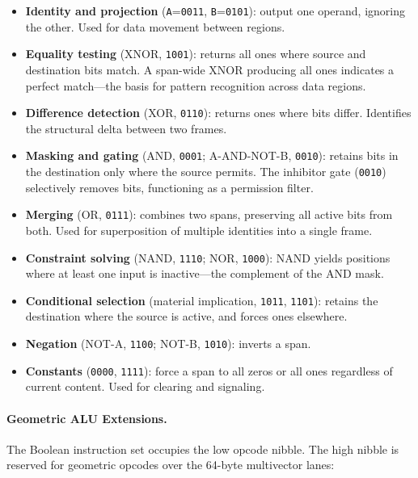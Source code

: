 \begin{itemize}[nosep]
  \item \textbf{Identity and projection} (\texttt{A}=\texttt{0011},
        \texttt{B}=\texttt{0101}): output one operand, ignoring the other.
        Used for data movement between regions.
  \item \textbf{Equality testing} (XNOR, \texttt{1001}): returns all
        ones where source and destination bits match.  A span-wide XNOR
        producing all ones indicates a perfect match---the basis for
        pattern recognition across data regions.
  \item \textbf{Difference detection} (XOR, \texttt{0110}): returns
        ones where bits differ.  Identifies the structural delta between
        two frames.
  \item \textbf{Masking and gating} (AND, \texttt{0001};
        A-AND-NOT-B, \texttt{0010}): retains bits in the destination
        only where the source permits.  The inhibitor gate
        (\texttt{0010}) selectively removes bits, functioning as a
        permission filter.
  \item \textbf{Merging} (OR, \texttt{0111}): combines two spans,
        preserving all active bits from both.  Used for superposition of
        multiple identities into a single frame.
  \item \textbf{Constraint solving} (NAND, \texttt{1110}; NOR,
        \texttt{1000}): NAND yields positions where at least one input
        is inactive---the complement of the AND mask.
  \item \textbf{Conditional selection} (material implication,
        \texttt{1011}, \texttt{1101}): retains the destination where the
        source is active, and forces ones elsewhere.
  \item \textbf{Negation} (NOT-A, \texttt{1100}; NOT-B, \texttt{1010}):
        inverts a span.
  \item \textbf{Constants} (\texttt{0000}, \texttt{1111}): force a
        span to all zeros or all ones regardless of current content.
        Used for clearing and signaling.
\end{itemize}

\paragraph{Geometric ALU Extensions.}
The Boolean instruction set occupies the low opcode nibble.  The high
nibble is reserved for geometric opcodes over the 64-byte multivector
lanes:

